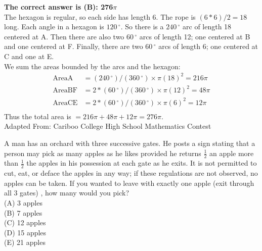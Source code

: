 \documentclass{article}
\begin{document}
\textbf{The correct answer is (B): 276$\pi$}\\[1 ex]
The hexagon is regular, so each side has length 6. The rope is $(6*6)/2=18$ long.  Each angle in a hexagon is $120\,^{\circ}$.  So there is a $240\,^{\circ}$ arc of length 18 centered at A.  Then there are also two $60\,^{\circ}$ arcs of length 12; one centered at B and one centered at F.  Finally, there are two $60\,^{\circ}$ arcs of length 6; one centered at C and one at E.\\[1 ex]
We sum the areas bounded by the arcs and the hexagon:
\begin{align*} 
\textrm{AreaA} &=(240\,^{\circ})/(360\,^{\circ})\times \pi(18)^2=216\pi\\
\textrm{AreaBF} &=2*(60\,^{\circ})/(360\,^{\circ})\times \pi(12)^2=48\pi\\
\textrm{AreaCE} &=2*(60\,^{\circ})/(360\,^{\circ})\times \pi(6)^2=12\pi\\
\end{align*}
Thus the total area is $=216\pi+48\pi+12\pi=276\pi$.
\\[5 ex]

\scriptsize
Adapted From: Cariboo College High School Mathematics Contest

\normalsize
A man has an orchard with three successive gates.  He posts a sign stating that a person may pick as many apples as he likes provided he returns $\frac{1}{2}$ an apple more than $\frac{1}{2}$ the apples in his possession at each gate as he exits.  It is not permitted to cut, eat, or deface the apples in any way; if these regulations are not observed, no apples can be taken.  If you wanted to leave with exactly one apple (exit through all 3 gates) , how many would you pick?\\
(A) 3 apples\\
(B) 7 apples\\
(C) 12 apples\\
(D) 15 apples\\
(E) 21 apples\\

\end{document}
